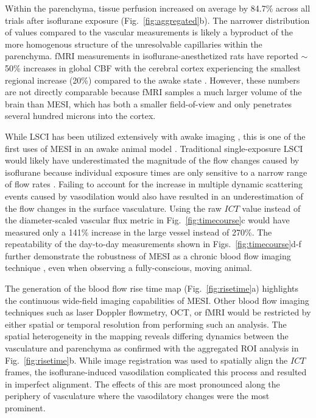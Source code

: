 \documentclass[review]{elsarticle}
\begin{document}
Within the parenchyma, tissue perfusion increased on average by 84.7\% across all trials after isoflurane exposure (Fig.~\ref{fig:aggregated}b). The narrower distribution of values compared to the vascular measurements is likely a byproduct of the more homogenous structure of the unresolvable capillaries within the parenchyma. fMRI measurements in isoflurane-anesthetized rats have reported $\sim$50\% increases in global CBF with the cerebral cortex experiencing the smallest regional increase (20\%) compared to the awake state \cite{Sicard:2003dj}. However, these numbers are not directly comparable because fMRI samples a much larger volume of the brain than MESI, which has both a smaller field-of-view and only penetrates several hundred microns into the cortex.

While LSCI has been utilized extensively with awake imaging \cite{Takuwa:2011jr,Seto:2014ga,Lu:2017bo,Balbi:2017cj,Sunil:2020ac}, this is one of the first uses of MESI in an awake animal model \cite{He:2020}. Traditional single-exposure LSCI would likely have underestimated the magnitude of the flow changes caused by isoflurane because individual exposure times are only sensitive to a narrow range of flow rates \cite{Parthasarathy:2008el}. Failing to account for the increase in multiple dynamic scattering events caused by vasodilation would also have resulted in an underestimation of the flow changes in the surface vasculature. Using the raw $ICT$ value instead of the diameter-scaled vascular flux metric in Fig.~\ref{fig:timecourse}c would have measured only a 141\% increase in the large vessel instead of 270\%. The repeatability of the day-to-day measurements shown in Figs.~\ref{fig:timecourse}d-f further demonstrate the robustness of MESI as a chronic blood flow imaging technique \cite{Kazmi:2013hp}, even when observing a fully-conscious, moving animal.

The generation of the blood flow rise time map (Fig.~\ref{fig:risetime}a) highlights the continuous wide-field imaging capabilities of MESI. Other blood flow imaging techniques such as laser Doppler flowmetry, OCT, or fMRI would be restricted by either spatial or temporal resolution from performing such an analysis. The spatial heterogeneity in the mapping reveals differing dynamics between the vasculature and parenchyma as confirmed with the aggregated ROI analysis in Fig.~\ref{fig:risetime}b. While image registration was used to spatially align the $ICT$ frames, the isoflurane-induced vasodilation complicated this process and resulted in imperfect alignment. The effects of this are most pronounced along the periphery of vasculature where the vasodilatory changes were the most prominent.
\end{document}
